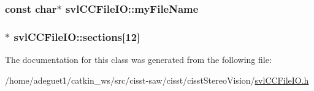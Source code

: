 \hypertarget{classsvl_c_c_file_i_o_a35c21bfeb403f11edeaa3cfe840bc131}{
\subsubsection[{my\-File\-Name}]{\setlength{\rightskip}{0pt plus 5cm}const char$\ast$ svl\-C\-C\-File\-I\-O\-::my\-File\-Name\hspace{0.3cm}{\ttfamily [protected]}}}\label{classsvl_c_c_file_i_o_a35c21bfeb403f11edeaa3cfe840bc131}
\hypertarget{classsvl_c_c_file_i_o_a23a716f9d66619a4d6dd8bca942a10e0}{
\subsubsection[{sections}]{$\ast$ svl\-C\-C\-File\-I\-O\-::sections\mbox{[}12\mbox{]}\hspace{0.3cm}{\ttfamily [protected]}}}\label{classsvl_c_c_file_i_o_a23a716f9d66619a4d6dd8bca942a10e0}


The documentation for this class was generated from the following file\-:\begin{DoxyCompactItemize}
\item 
/home/adeguet1/catkin\-\_\-ws/src/cisst-\/saw/cisst/cisst\-Stereo\-Vision/\hyperlink{svl_c_c_file_i_o_8h}{svl\-C\-C\-File\-I\-O.\-h}\end{DoxyCompactItemize}
